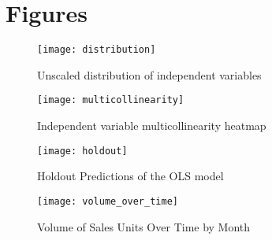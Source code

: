 \section{Figures}
\begin{figure}[htb!]
\centering
  \texttt{[image: distribution]}
  \caption{Unscaled distribution of independent variables}
\end{figure}

\begin{figure}[htb!]
\centering
  \texttt{[image: multicollinearity]}
  \caption{Independent variable multicollinearity heatmap}
\end{figure}

\begin{figure}[htb!]
\centering
  \texttt{[image: holdout]}
  \caption{Holdout Predictions of the OLS model}
\end{figure}

\begin{figure}[htb!]
\centering
  \texttt{[image: volume\_over\_time]}
  \caption{Volume of Sales Units Over Time by Month}
\end{figure}

